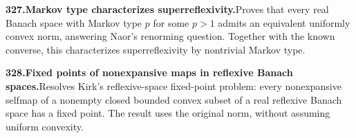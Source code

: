 \documentclass[11pt,a4paper]{article}
\begin{document}
  \par \begin{minipage}{\linewidth}
  \fontsize{10.5}{12.6}\selectfont\RaggedRight
  \hypertarget{result 327}{}
  {\bfseries\textcolor{muted}{327.}\enspace Markov type characterizes superreflexivity.}\enspace Proves that every real Banach space with Markov type $p$ for some $p>1$ admits an equivalent uniformly convex norm, answering Naor's renorming question. Together with the known converse, this characterizes superreflexivity by nontrivial Markov type.\par
  \end{minipage}\par\vspace{5pt}



  \par \begin{minipage}{\linewidth}
  \fontsize{10.5}{12.6}\selectfont\RaggedRight
  \hypertarget{result 328}{}
  {\bfseries\textcolor{muted}{328.}\enspace Fixed points of nonexpansive maps in reflexive Banach spaces.}\enspace Resolves Kirk's reflexive-space fixed-point problem: every nonexpansive selfmap of a nonempty closed bounded convex subset of a real reflexive Banach space has a fixed point. The result uses the original norm, without assuming uniform convexity.\par
  \end{minipage}\par\vspace{5pt}
\end{document}
